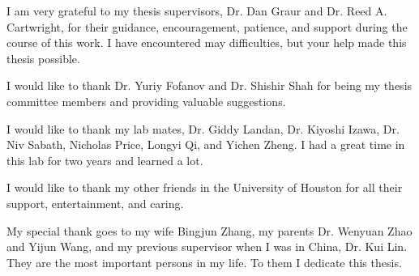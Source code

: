I am very grateful to my thesis supervisors, Dr. Dan Graur and Dr. Reed A. Cartwright, for their guidance, encouragement, patience, and support during the course of this work. I have encountered may difficulties, but your help made this thesis possible.

I would like to thank Dr. Yuriy Fofanov and Dr. Shishir Shah for being my thesis committee members and providing valuable suggestions.

I would like to thank my lab mates, Dr. Giddy Landan, Dr. Kiyoshi Izawa, Dr. Niv Sabath, Nicholas Price, Longyi Qi, and Yichen Zheng. I had a great time in this lab for two years and learned a lot.

I would like to thank my other friends in the University of Houston for all their support, entertainment, and caring.

My special thank goes to my wife Bingjun Zhang, my parents Dr. Wenyuan Zhao and Yijun Wang, and my previous supervisor when I was in China, Dr. Kui Lin. They are the most important persons in my life. To them I dedicate this thesis.

